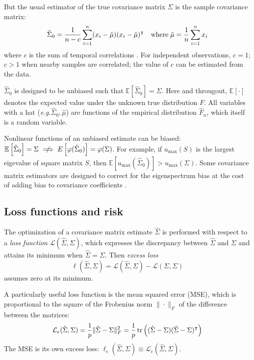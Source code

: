 But the usual estimator of the true covariance matrix $\Sigma$ is  the sample covariance matrix:
\begin{equation}
\hat\Sigma_0 =  \frac 1 {n-c} \sum\limits_{i=1}^n (x_i -\hat\mu) (x_i - \hat\mu)^\intercal
\quad\mbox{where}\;
\hat\mu = \frac 1 n \sum\limits_{i=1}^n x_i
\end{equation}
where $c$ is the sum of temporal correlations . For independent observations, $c=1$;  $c>1$ when nearby samples are correlated; the value of $c$ can be estimated from the data.

$\hat\Sigma_0$ is designed to be unbiased such that $\mathbb E\left[\hat\Sigma_0\right]=\Sigma$.
Here and througout, $\mathbb E[\cdot]$ denotes the expected value under the  unknown true distribution $F$. All variables with a hat (\emph{e.g.}\;$\hat \Sigma_0,\hat \mu$) are functions of the empirical distribution $\hat F_n$, which itself is a random variable.

Nonlinear functions of an unbiased estimate can be biased: $\mathbb E\left[\hat\Sigma_0\right]=\Sigma \centernot\implies  E\left[\varphi(\hat\Sigma_0)\right]=\varphi(\Sigma)$.  For example, if $u_{\max}(S)$ is the largest eigevalue of square matrix $S$, then $\mathbb E\left[u_{\max}(\hat\Sigma_0)\right] > u_{\max}(\Sigma)$. Some covariance matrix estimators are designed to correct for the eigenspectrum bias at the cost of adding bias to covariance coefficients \citep{Ledoit:2004}.




\subsection{Loss functions and risk}
The optimization of a covariance matrix estimate $\hat\Sigma$ is performed with respect to a \emph{loss function} $\mathcal L(\hat\Sigma,\Sigma)$, which expresses the discrepancy between $\hat\Sigma$ and $\Sigma$ and attains its minimum when $\hat\Sigma=\Sigma$.  
Then \emph{excess loss}  
\begin{equation}
\ell(\hat\Sigma,\Sigma) = \mathcal L(\hat\Sigma,\Sigma)-\mathcal L(\Sigma,\Sigma)
\end{equation}
assumes zero at its minimum.

A particularly useful loss function is the mean squared error (MSE), which is proportional to the square of the Frobenius  norm $\|\cdot\|_F$ of the difference between the matrices: 
\begin{equation}\label{eq:MSE}
\mathcal L_e(\hat\Sigma,\Sigma) =\frac 1 p \|\hat\Sigma-\Sigma\|_F^2 = \frac 1 p \operatorname{tr}\left((\hat \Sigma-\Sigma)(\hat\Sigma-\Sigma)^\intercal\right)
\end{equation}
The MSE is its own excess loss: $\ell_e(\hat\Sigma,\Sigma) \equiv \mathcal L_e(\hat\Sigma,\Sigma)$.

